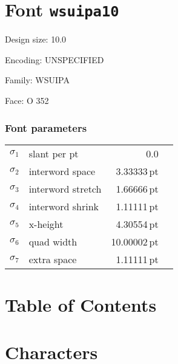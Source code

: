 \documentclass{article}
\newlength{\maxcharwidth}
\begin{document}
\setlength{\maxcharwidth}{70.00012pt}
\addtolength{\maxcharwidth}{2\fboxsep}

\section{Font \texttt{wsuipa10}}


Design size: 10.0\,

Encoding: UNSPECIFIED

Family: WSUIPA

Face: O 352

\subsubsection{Font parameters}

\begin{tabular}{@{}llr@{\quad}l}
$\sigma_1$ & slant per pt & 0.0 \\
$\sigma_2$ & interword space & 3.33333\,pt \\
$\sigma_3$ & interword stretch & 1.66666\,pt \\
$\sigma_4$ & interword shrink & 1.11111\,pt \\
$\sigma_5$ & x-height & 4.30554\,pt \\
$\sigma_6$ & quad width & 10.00002\,pt \\
$\sigma_7$ & extra space & 1.11111\,pt \\
\end{tabular}

\clearpage

\section{Table of Contents}

\begingroup



\endgroup

\clearpage

\section{Characters}
\end{document}
